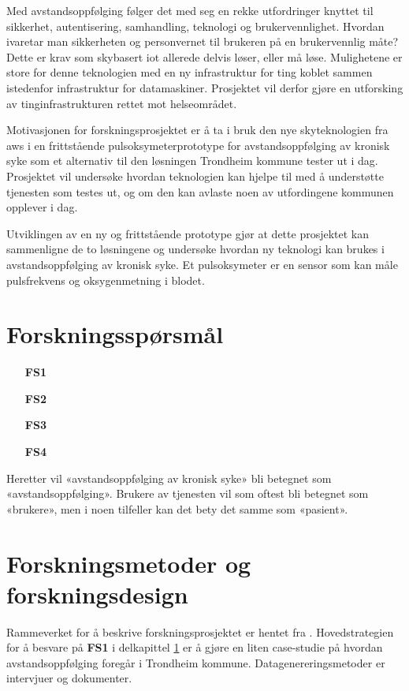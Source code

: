 Med avstandsoppfølging følger det med seg en rekke utfordringer knyttet til sikkerhet, autentisering, samhandling,
teknologi og brukervennlighet. Hvordan ivaretar man sikkerheten og personvernet til brukeren på en brukervennlig måte?
Dette er krav som skybasert \gls{iot} allerede delvis løser, eller må løse. Mulighetene er store for denne teknologien
med en ny infrastruktur for ting koblet sammen istedenfor infrastruktur for datamaskiner. Prosjektet vil derfor gjøre en utforsking
av tinginfrastrukturen rettet mot helseområdet.

Motivasjonen for forskningsprosjektet er å ta i bruk den nye skyteknologien fra \gls{aws} i en frittstående
pulsoksymeterprototype for avstandsoppfølging av kronisk syke som et alternativ til den løsningen Trondheim
kommune tester ut i dag. Prosjektet vil undersøke hvordan teknologien kan hjelpe til med å understøtte tjenesten som testes ut,
og om den kan avlaste noen av utfordingene kommunen opplever i dag.

Utviklingen av en ny og frittstående prototype gjør at dette prosjektet kan sammenligne de to løsningene og undersøke hvordan ny
teknologi kan brukes i avstandsoppfølging av kronisk syke. Et pulsoksymeter er en sensor som kan måle pulsfrekvens og oksygenmetning i blodet. 

\section{Forskningsspørsmål}
\label{sec:res_questions}

\begin{enumerate}
    \item[\textbf{FS1}] 
    \item[\textbf{FS2}] 
    \item[\textbf{FS3}] 
    \item[\textbf{FS4}] 
\end{enumerate}

Heretter vil «avstandsoppfølging av kronisk syke» bli betegnet som «avstandsoppfølging». Brukere av tjenesten vil
som oftest bli betegnet som «brukere», men i noen tilfeller kan det bety det samme som «pasient».

\section{Forskningsmetoder og forskningsdesign}
Rammeverket for å beskrive forskningsprosjektet er hentet fra \citet{oates}. Hovedstrategien for å besvare på \textbf{FS1} i
delkapittel \ref{sec:res_questions} er å gjøre en liten case-studie på hvordan avstandsoppfølging foregår i Trondheim kommune. Datagenereringsmetoder
er intervjuer og dokumenter. 

